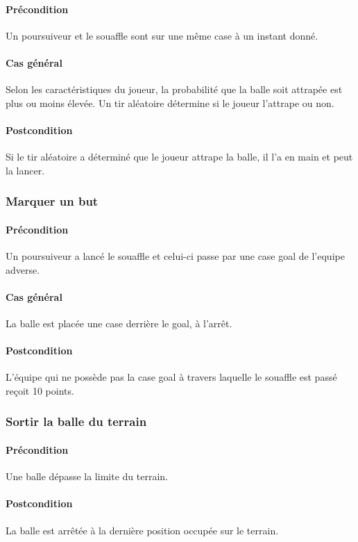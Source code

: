     \paragraph{Précondition} Un \gls{poursuiveur} et le \gls{souaffle} sont sur une même case à un instant donné.
    \paragraph{Cas général} Selon les caractéristiques du joueur, la probabilité que la balle soit attrapée est plus ou moins élevée. Un tir aléatoire détermine si le joueur l'attrape ou non.
    \paragraph{Postcondition} Si le tir aléatoire a déterminé que le joueur attrape la balle, il l'a en main et peut la lancer.

\subsubsection{Marquer un but}
    \paragraph{Précondition} Un \gls{poursuiveur} a lancé le souaffle et celui-ci passe par une case goal de l'\gls{equipe} adverse. 
    \paragraph{Cas général} La balle est placée une case derrière le goal, à l'arrêt.
    \paragraph{Postcondition} L'équipe qui ne possède pas la case goal à travers laquelle le souaffle est passé reçoit 10 points.

\subsubsection{Sortir la balle du terrain}
    \paragraph{Précondition} Une balle dépasse la limite du terrain.
    \paragraph{Postcondition} La balle est arrêtée à la dernière position occupée sur le terrain.
